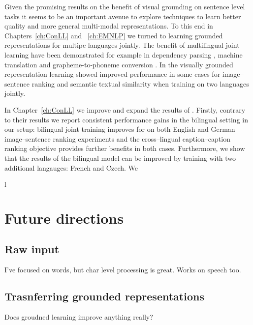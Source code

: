 Given the promising results on the benefit of visual grounding on sentence level tasks it seems
to be an important avenue to explore techniques to learn better quality and more 
general multi-modal representations. To this end in Chapters~\ref{ch:ConLL} and ~\ref{ch:EMNLP} 
we turned to learning grounded representations for multipe languages jointly. 
The benefit of multilingual joint learning have been demonstrated for example in dependency parsing
 \citep{ammar2016many}, machine translation \citep{johnson2016google} and grapheme-to-phoneme
 conversion \citep{peters2017massively}. 
 In the visually grounded representation learning \citep{gella2017image} showed improved 
 performance in some cases for image--sentence ranking and semantic textual similarity when training
 on two languages jointly.
 
  In Chapter~\ref{ch:ConLL} we improve and expand the results of 
 \cite{gella2017image}. Firstly, contrary to their results we report consistent performance gains in the
 bilingual setting in our setup: bilingual joint training improves for on both English and German image--sentence
 ranking experiments and the cross--lingual caption--caption ranking objective provides further benefits
 in both cases. Furthermore, we show that the results of the bilingual model can be improved by training
 with two additional langauges: French and Czech. We 







l%

\section{Future directions}


\subsection{Raw input}
I've focused on words, but char level processing is great. Works on speech too.

\subsection{Trasnferring grounded representations}
Does groudned learning improve anything really?



